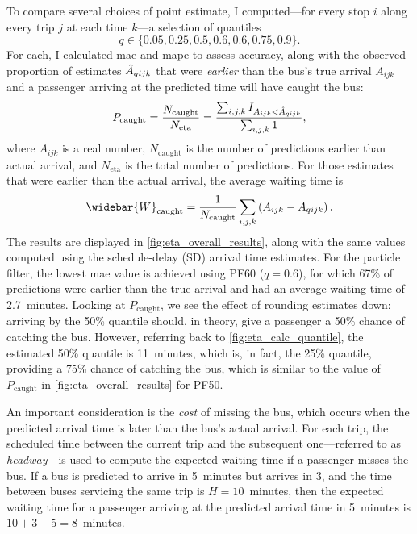 To compare several choices of point estimate, I computed---for every stop $i$ along every trip $j$ at each time $k$---a selection of quantiles
\[
  q \in \{0.05, 0.25, 0.5, 0.6, 0.6, 0.75, 0.9\}.
\]
For each, I calculated \gls{mae} and \gls{mape} to assess accuracy, along with the observed proportion of estimates $\hat{A}_{qijk}$ that were \emph{earlier} than the bus's true arrival $A_{ijk}$ and a passenger arriving at the predicted time will have caught the bus:
\begin{equation}
\label{eq:pr_bus_caught}
P_\text{caught} = \frac{N_\text{caught}}{N_\text{eta}}
= \frac{\sum_{i,j,k} I_{A_{ijk} < \hat{A}_{qijk}}}{\sum_{i,j,k} 1},
\end{equation}
where $A_{ijk}$ is a real number, $N_\text{caught}$ is the number of predictions earlier than actual arrival, and $N_\text{eta}$ is the total number of predictions. For those estimates that were earlier than the actual arrival, the average waiting time is
\begin{equation}
\label{eq:avg_wait_time}
\widebar{W}_\text{caught} =
\frac{1}{N_\text{caught}} \sum_{i,j,k} \left(A_{ijk} - \Teta_{qijk}\right).
\end{equation}
The results are displayed in \cref{fig:eta_overall_results}, along with the same values computed using the schedule-delay (SD) arrival time estimates. For the particle filter, the lowest \gls{mae} value is achieved using PF60 ($q = 0.6$), for which 67\% of predictions were earlier than the true arrival and had an average waiting time of 2.7~minutes. Looking at $P_\text{caught}$, we see the effect of rounding estimates down: arriving by the 50\% quantile should, in theory, give a passenger a 50\% chance of catching the bus. However, referring back to \cref{fig:eta_calc_quantile}, the estimated 50\% quantile is 11~minutes, which is, in fact, the 25\% quantile, providing a 75\% chance of catching the bus, which is similar to the value of $P_\text{caught}$ in \cref{fig:eta_overall_results} for PF50.



An important consideration is the \emph{cost} of missing the bus, which occurs when the predicted arrival time is later than the bus's actual arrival. For each trip, the scheduled time between the current trip and the subsequent one---referred to as \emph{headway}---is used to compute the expected waiting time if a passenger misses the bus. If a bus is predicted to arrive in 5~minutes but arrives in 3, and the time between buses servicing the same trip is $H = 10$~minutes, then the expected waiting time for a passenger arriving at the predicted arrival time in 5~minutes is $10+3-5=8$~minutes.


